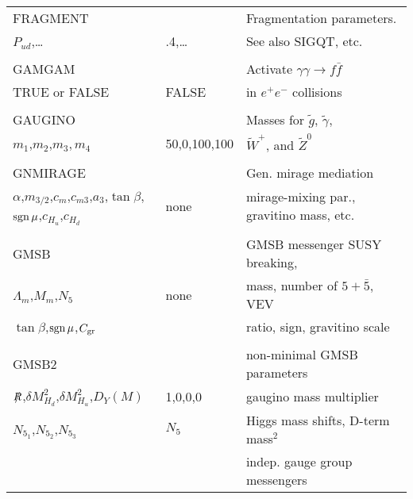 \newpage
\begin{center}
\begin{tabular}{lll}
\hline\hline
FRAGMENT               &                   & Fragmentation parameters.      \\
$P_{ud}$,\dots         & .4,\dots          & See also SIGQT, etc.           \\
                       &                   &                                \\
GAMGAM                 &             & Activate $\gamma\gamma\to f\bar{f}$  \\
TRUE or FALSE          & FALSE             & in $e^+e^-$ collisions         \\
                       &                   &                                \\
GAUGINO                &                   & Masses for $\tilde g$, 
$\tilde\gamma$,                                                             \\
$m_1$,$m_2$,$m_3,m_4$  & 50,0,100,100      & $\tilde W^+$, and $\tilde Z^0$ \\
                       &                   &                                \\
GNMIRAGE               &                   & Gen. mirage mediation           \\
$\alpha$,$m_{3/2}$,$c_m$,$c_{m3}$,$a_3$,$\tan\beta$,$\mathop{\rm sgn}\mu$,$c_{H_u}$,$c_{H_d}$ & none & mirage-mixing par., gravitino mass, etc.\\
                       &                   &                                \\
GMSB                   &                   & GMSB messenger SUSY breaking,  \\
$\Lambda_m$,$M_m$,$N_5$ & none             & mass, number of $5+\bar5$, VEV \\
$\tan\beta$,$\mathop{\rm sgn}\mu$,$C_{\rm gr}$ &       & ratio, sign, gravitino scale   \\
                       &                   &                                \\
GMSB2                  &                   & non-minimal GMSB parameters    \\
$\slashchar{R}$,$\delta M_{H_d}^2$,$\delta M_{H_u}^2$,$D_Y(M)$ & 1,0,0,0 & 
gaugino mass multiplier \\
$N_{5_1}$,$N_{5_2}$,$N_{5_3}$ & $N_5$     & Higgs mass shifts, D-term mass$^2$\\
                       &                   & indep. gauge group messengers  \\

\end{tabular}
\end{center}
